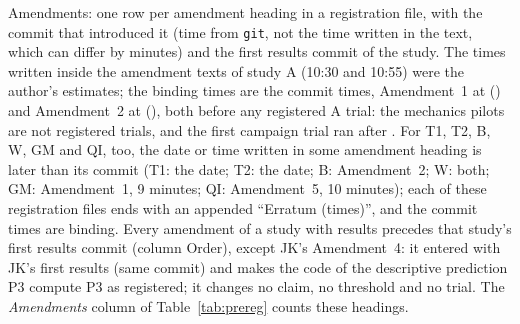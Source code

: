 \documentclass[conference]{IEEEtran}
\begin{document}
\begin{table}[h]\centering\caption{Amendments: one row per amendment heading in a registration file, with the commit that introduced it (time from \texttt{git}, not the time written in the text, which can differ by minutes) and the first results commit of the study. The times written inside the amendment texts of study A (10:30 and 10:55) were the author's estimates; the binding times are the commit times, Amendment~1 at \AAmendCommit{} (\AAmendTime) and Amendment~2 at \AAmendTwoCommit{} (\AAmendTwoTime), both before any registered A trial: the mechanics pilots are not registered trials, and the first campaign trial ran after \ACampaignStart{}.  For T1, T2, B, W, GM and QI, too, the date or time written in some amendment heading is later than its commit (T1: the date; T2: the date; B: Amendment~2; W: both; GM: Amendment~1, 9 minutes; QI: Amendment~5, 10 minutes); each of these registration files ends with an appended ``Erratum (times)'', and the commit times are binding. Every amendment of a study with results precedes that study's first results commit (column Order), except JK's Amendment~4: it entered with JK's first results (same commit) and makes the code of the descriptive prediction P3 compute P3 as registered; it changes no claim, no threshold and no trial. The \emph{Amendments} column of Table~\ref{tab:prereg} counts these headings.}\label{tab:amend}
\resizebox{\linewidth}{!}{}\end{table}
\end{document}
